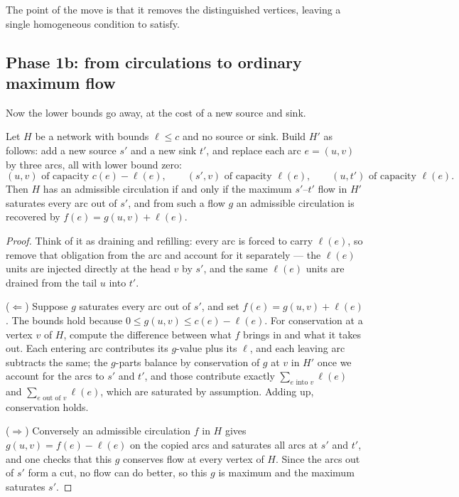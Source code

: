 The point of the move is that it removes the distinguished vertices, leaving a
single homogeneous condition to satisfy.

\subsection{Phase 1b: from circulations to ordinary maximum flow}

Now the lower bounds go away, at the cost of a new source and sink.

\begin{lemma}\label{lem:flow-circulation-to-maxflow}
Let $H$ be a network with bounds $\ell \le c$ and no source or sink. Build
$H'$ as follows: add a new source $s'$ and a new sink $t'$, and replace each
arc $e = (u,v)$ by three arcs, all with lower bound zero:
\[ (u,v) \text{ of capacity } c(e)-\ell(e), \qquad
   (s',v) \text{ of capacity } \ell(e), \qquad
   (u,t') \text{ of capacity } \ell(e). \]
Then $H$ has an admissible circulation if and only if the maximum $s'$--$t'$
flow in $H'$ saturates every arc out of $s'$, and from such a flow $g$ an
admissible circulation is recovered by $f(e) = g(u,v) + \ell(e)$.
\end{lemma}

\begin{proof}
Think of it as draining and refilling: every arc is forced to carry $\ell(e)$,
so remove that obligation from the arc and account for it separately --- the
$\ell(e)$ units are injected directly at the head $v$ by $s'$, and the same
$\ell(e)$ units are drained from the tail $u$ into $t'$.

($\Leftarrow$) Suppose $g$ saturates every arc out of $s'$, and set
$f(e) = g(u,v) + \ell(e)$. The bounds hold because
$0 \le g(u,v) \le c(e)-\ell(e)$. For conservation at a vertex $v$ of $H$,
compute the difference between what $f$ brings in and what it takes out. Each
entering arc contributes its $g$-value plus its $\ell$, and each leaving arc
subtracts the same; the $g$-parts balance by conservation of $g$ at $v$ in
$H'$ once we account for the arcs to $s'$ and $t'$, and those contribute
exactly $\sum_{e \text{ into } v} \ell(e)$ and
$\sum_{e \text{ out of } v} \ell(e)$, which are saturated by assumption.
Adding up, conservation holds.

($\Rightarrow$) Conversely an admissible circulation $f$ in $H$ gives
$g(u,v) = f(e) - \ell(e)$ on the copied arcs and saturates all arcs at $s'$ and
$t'$, and one checks that this $g$ conserves flow at every vertex of $H$.
Since the arcs out of $s'$ form a cut, no flow can do better, so this $g$ is
maximum and the maximum saturates $s'$.
\end{proof}

